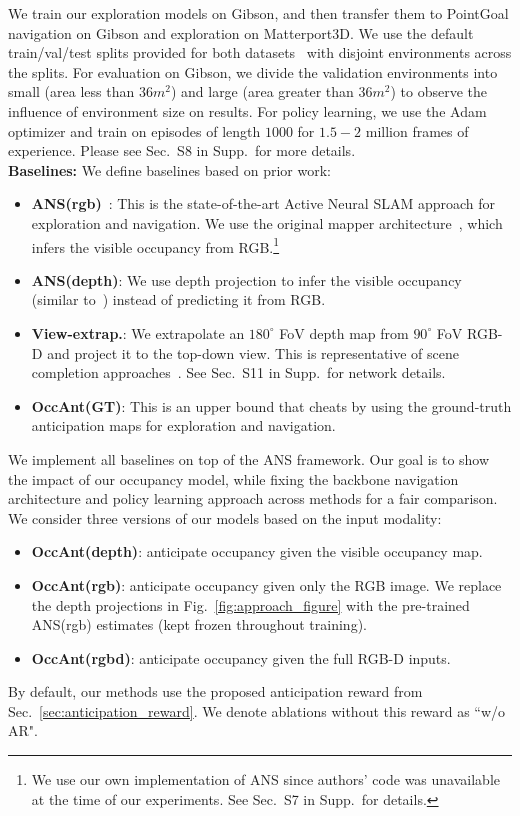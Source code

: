 \documentclass[runningheads]{llncs}
\begin{document}
We train our exploration models on Gibson, and then transfer them to PointGoal navigation on Gibson and exploration on Matterport3D. We use the default train/val/test splits provided for both datasets~\cite{habitat19iccv} with disjoint environments across the splits.  For evaluation on Gibson, we divide the validation environments into small (area less than $36\si{m^2}$) and large (area greater than $36\si{m^2}$) to observe the influence of environment size on results. For policy learning, we use the Adam optimizer and train on episodes of length $1000$ for $1.5-2$ million frames of experience. Please see Sec.~S8 in Supp.~for more details. \\

\noindent\textbf{Baselines:} We define baselines based on prior work:
\begin{itemize}
    \item \textbf{ANS(rgb)}~\cite{chaplot2020learning}: This is the state-of-the-art Active Neural SLAM approach for exploration and navigation. We use the original mapper architecture~\cite{chaplot2020learning}, which infers the visible occupancy from RGB.\footnote{We use our own implementation of ANS since authors' code was unavailable at the time of our experiments. See Sec.~S7 in Supp.~for details.}
    \item \textbf{ANS(depth)}: We use depth projection to infer the visible occupancy (similar to~\cite{chen2019learning}) instead of predicting it from RGB.
    \item \textbf{View-extrap.}: We extrapolate an $180^{\circ}$ FoV depth map from $90^{\circ}$ FoV RGB-D and project it to the top-down view.  This is representative of scene completion approaches~\cite{song2018im2pano3d,Yang_2019_CVPR}. See Sec.~S11 in Supp.~for network details.
    \item \textbf{OccAnt(GT)}: This is an upper bound that cheats by using the ground-truth anticipation maps for exploration and navigation.
\end{itemize}

We implement all baselines on top of the ANS framework. Our goal is to show the impact of our occupancy model, while fixing the backbone navigation architecture and policy learning approach across methods for a fair comparison. We consider three versions of our models based on the input modality:

\begin{itemize}
    \item \textbf{OccAnt(depth)}: anticipate occupancy given the visible occupancy map. 
    \item \textbf{OccAnt(rgb)}: anticipate occupancy given only the RGB image. We replace the depth projections in Fig.~\ref{fig:approach_figure} with the pre-trained ANS(rgb) estimates (kept frozen throughout training).
    \item \textbf{OccAnt(rgbd)}: anticipate occupancy given the full RGB-D inputs.
\end{itemize}
By default, our methods use the proposed anticipation reward from Sec.~\ref{sec:anticipation_reward}. We denote ablations without this reward as ``w/o AR". \\
\end{document}
